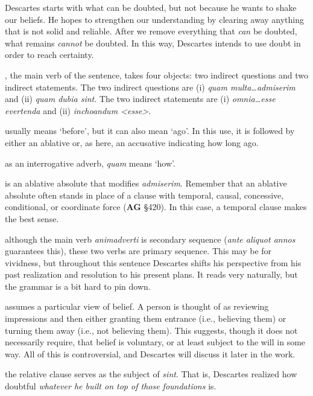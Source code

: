 \prenotes

Descartes starts with what can be doubted, but not because he wants to shake our beliefs. He hopes to strengthen our understanding by clearing away anything that is not solid and reliable. After we remove everything that \textit{can} be doubted, what remains \textit{cannot} be doubted. In this way, Descartes intends to use doubt in order to reach certainty.

, the main verb of the sentence, takes four objects: two indirect questions and two indirect statements. The two indirect questions are (i) \textit{quam multa\dots admiserim} and (ii) \textit{quam dubia sint}. The two indirect statements are (i) \textit{omnia\dots esse evertenda} and (ii) \textit{inchoandum <esse>}.

 usually means `before', but it can also mean `ago'. In this use, it is followed by either an ablative or, as here, an accusative indicating how long ago.

 as an interrogative adverb, \textit{quam} means `how'.

 is an ablative absolute that modifies \textit{admiserim}. Remember that an ablative absolute often stands in place of a clause with temporal, causal, concessive, conditional, or coordinate force (\textbf{AG} §420). In this case, a temporal clause makes the best sense.

 although the main verb \textit{animadverti} is secondary sequence (\textit{ante aliquot annos} guarantees this), these two verbs are primary sequence. This may be for vividness, but throughout this sentence Descartes shifts his perspective from his past realization and resolution to his present plans. It reads very naturally, but the grammar is a bit hard to pin down.

 assumes a particular view of belief. A person is thought of as reviewing impressions and then either granting them entrance (i.e., believing them) or turning them away (i.e., not believing them). This suggests, though it does not necessarily require, that belief is voluntary, or at least subject to the will in some way. All of this is controversial, and Descartes will discuss it later in the work.

 the relative clause serves as the subject of \textit{sint}. That is, Descartes realized how doubtful \textit{whatever he built on top of those foundations} is.

